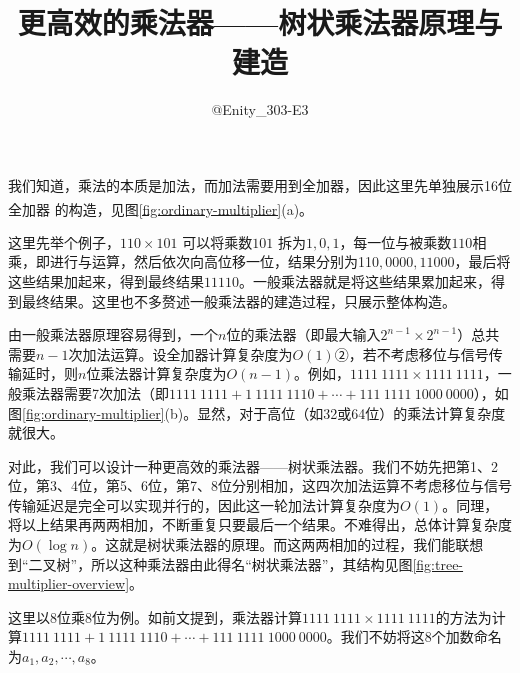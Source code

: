 \documentclass[UTF8,12pt,punct=kaiming,fontset=none]{ctexart}
\title{\vspace{-1.5cm}更高效的乘法器——树状乘法器原理与建造\vspace{-0.5cm}}
\author{@Enity\_303-E3}
\date{}
\newcommand*{\upcite}[1]{
    \textsuperscript{\cite{#1}}
}
\begin{document}
\hypersetup{bookmarksdepth=-1}  %
\maketitle
\thispagestyle{fancy}  %
\vspace{-0.7cm}

\titleformat{\section}[hang]{\large\sffamily\bfseries}{\textmd{\thesection}}{0.5cm}{}
\titlespacing{\section}{0cm}{0.5ex}{0.2ex}
\setcounter{section}{0}

我们知道，乘法的本质是加法，而加法需要用到全加器，因此这里先单独展示16位全加器\upcite{full_adder}的构造，见图\ref{fig:ordinary-multiplier}(a)。

这里先举个例子，$110\times101$ 可以将乘数$101$ 拆为$1,0,1$，每一位与被乘数$110$相乘，即进行与运算，然后依次向高位移一位，结果分别为11$0,0000,11000$，最后将这些结果加起来，得到最终结果$11110$。一般乘法器就是将这些结果累加起来，得到最终结果。这里也不多赘述一般乘法器的建造过程，只展示整体构造。

由一般乘法器原理容易得到，一个$n$位的乘法器（即最大输入$2^{n-1}\times2^{n-1}$）总共需要$n-1$次加法运算。设全加器计算复杂度为$O(1)$②，若不考虑移位与信号传输延时，则$n$位乘法器计算复杂度为$O(n-1)$。例如，$1111\ 1111\times1111\ 1111$，一般乘法器需要7次加法（即$1111\ 1111+1\ 1111\ 1110+\cdots+111\ 1111\ 1000\ 0000$），如图\ref{fig:ordinary-multiplier}(b)。显然，对于高位（如32或64位）的乘法计算复杂度就很大。

对此，我们可以设计一种更高效的乘法器——树状乘法器。我们不妨先把第1、2位，第3、4位，第5、6位，第7、8位分别相加，这四次加法运算不考虑移位与信号传输延迟是完全可以实现并行的，因此这一轮加法计算复杂度为$O(1)$。同理，将以上结果再两两相加，不断重复只要最后一个结果。不难得出，总体计算复杂度为$O(\log n)$。这就是树状乘法器的原理。而这两两相加的过程，我们能联想到“二叉树”，所以这种乘法器由此得名“树状乘法器”，其结构见图\ref{fig:tree-multiplier-overview}。

这里以8位乘8位为例。如前文提到，乘法器计算$1111\ 1111\times1111\ 1111$的方法为计算$1111\ 1111+1\ 1111\ 1110+\cdots+111\ 1111\ 1000\ 0000$。我们不妨将这8个加数命名为$a_1,a_2,\cdots,a_8$。
\end{document}
